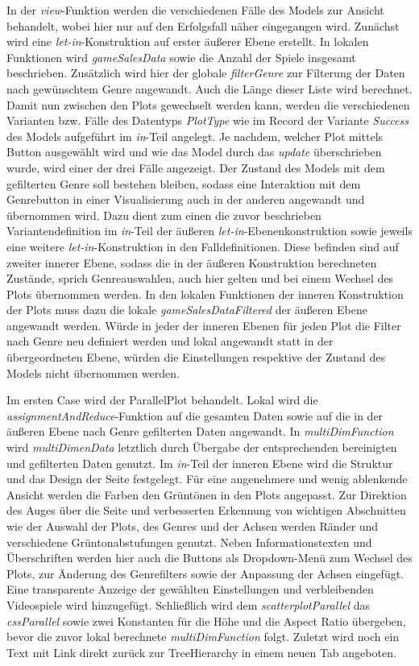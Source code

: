 \documentclass[usegeometry=true]{scrartcl}
\begin{document}
In der \textit{view}-Funktion werden die verschiedenen Fälle des Models zur Ansicht behandelt, wobei hier nur auf den Erfolgsfall näher eingegangen wird. 
Zunächst wird eine \textit{let-in}-Konstruktion auf erster äußerer Ebene erstellt. 
In lokalen Funktionen wird \textit{gameSalesData} sowie die Anzahl der Spiele insgesamt beschrieben.
Zusätzlich wird hier der globale \textit{filterGenre} zur Filterung der Daten nach gewünschtem Genre angewandt.
Auch die Länge dieser Liste wird berechnet. 
Damit nun zwischen den Plots gewechselt werden kann, werden die verschiedenen Varianten bzw. Fälle des Datentyps \textit{PlotType} wie im Record der Variante \textit{Success} des Models aufgeführt im \textit{in}-Teil angelegt. 
Je nachdem, welcher Plot mittels Button ausgewählt wird und wie das Model durch das \textit{update} überschrieben wurde, wird einer der drei Fälle angezeigt. 
Der Zustand des Models mit dem gefilterten Genre soll bestehen bleiben, sodass eine Interaktion mit dem Genrebutton in einer Visualisierung auch in der anderen angewandt und übernommen wird.
Dazu dient zum einen die zuvor beschrieben Variantendefinition im \textit{in}-Teil der äußeren \textit{let-in}-Ebenenkonstruktion sowie jeweils eine weitere \textit{let-in}-Konstruktion in den Falldefinitionen.
Diese befinden sind auf zweiter innerer Ebene, sodass die in der äußeren Konstruktion berechneten Zustände, sprich Genreauswahlen, auch hier gelten und bei einem Wechsel des Plots übernommen werden. 
In den lokalen Funktionen der inneren Konstruktion der Plots muss dazu die lokale \textit{gameSalesDataFiltered} der äußeren Ebene angewandt werden. 
Würde in jeder der inneren Ebenen für jeden Plot die Filter nach Genre neu definiert werden und lokal angewandt statt in der übergeordneten Ebene, würden die Einstellungen respektive der Zustand des Models nicht übernommen werden.

Im ersten Case wird der ParallelPlot behandelt.
Lokal wird die \textit{assignmentAndReduce}-Funktion auf die gesamten Daten sowie auf die in der äußeren Ebene nach Genre gefilterten Daten angewandt.
In \textit{multiDimFunction} wird \textit{multiDimenData} letztlich durch Übergabe der entsprechenden bereinigten und gefilterten Daten genutzt. 
Im \textit{in}-Teil der inneren Ebene wird die Struktur und das Design der Seite festgelegt.
Für eine angenehmere und wenig ablenkende Ansicht werden die Farben den Grüntönen in den Plots angepasst. 
Zur Direktion des Auges über die Seite und verbesserten Erkennung von wichtigen Abschnitten wie der Auswahl der Plots, des Genres und der Achsen werden Ränder und verschiedene Grüntonabstufungen genutzt.
Neben Informationstexten und Überschriften werden hier auch die Buttons als Dropdown-Menü zum Wechsel des Plots, zur Änderung des Genrefilters sowie der Anpassung der Achsen eingefügt.
Eine transparente Anzeige der gewählten Einstellungen und verbleibenden Videospiele wird hinzugefügt.
Schließlich wird dem \textit{scatterplotParallel} das \textit{cssParallel} sowie zwei Konstanten für die Höhe und die Aspect Ratio übergeben, bevor die zuvor lokal berechnete \textit{multiDimFunction} folgt. 
Zuletzt wird noch ein Text mit Link direkt zurück zur TreeHierarchy in einem neuen Tab angeboten.
\end{document}

